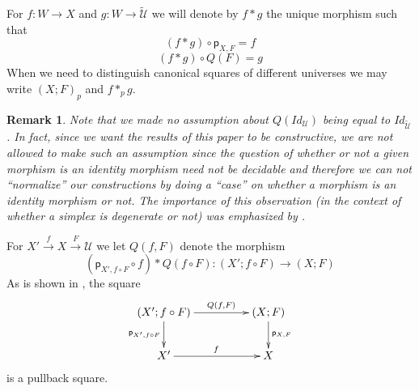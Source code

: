 \documentclass[12pt]{article}
\numberwithin{equation}{section}
\newenvironment{eq}{\begin{equation}}{\end{equation}}
\newtheorem{remark}[proposition]{Remark}
\newcommand{\llabel}[1]{\label{#1}}
\newcommand{\sr}{\rightarrow}
\newcommand{\wt}{\widetilde}
\newcommand{\p}{\mathsf{p}}
\newcommand{\U}{\mathcal{U}}
\begin{document}
For $f:W\sr X$ and $g:W\sr \wt{\U}$ we will denote by $f*g$ the unique morphism
such that
%
$$(f*g)\circ \p_{X,F}=f$$
$$(f*g)\circ Q(F)=g$$
%
When we need to distinguish canonical squares of different universes we may
write $(X;F)_{p}$ and $f*_p g$.
%
\begin{remark}\rm
\llabel{2015.03.29.rm1} Note that we made no assumption about $Q(Id_\U)$ being
equal to $Id_{\wt{\U}}$. In fact, since we want the results of this paper to be
constructive, we are not allowed to make such an assumption since the question
of whether or not a given morphism is an identity morphism need not be
decidable and therefore we can not ``normalize'' our constructions by doing a
``case'' on whether a morphism is an identity morphism or not. The importance
of this observation (in the context of whether a simplex is degenerate or not)
was emphasized by \cite{BCH}.
\end{remark}
%
For $X'\stackrel{f}{\sr}X\stackrel{F}{\sr}\U$ we let $Q(f,F)$ denote the
morphism
%
$$(\p_{X',f\circ F}\circ f)*Q(f\circ F):(X';f\circ F)\sr (X;F)$$
%
As is shown in \cite{fromunivwithPi}, the square
%
\begin{eq}
\llabel{2015.04.06.l0.sq}
\begin{xy}
          \xymatrix@C=4pc{ (X';f\circ F) \ar[r]^-{Q(f,F)} \ar[d]_{\p_{X',f\circ
                F}} & (X;F) \ar[d]^{\p_{X,F}}\\ X' \ar[r]^{f} & X }
       \end{xy}
\end{eq}
%
is a pullback square.
\end{document}
